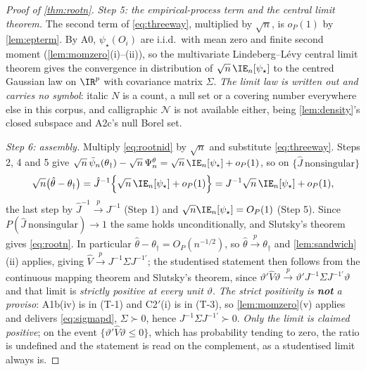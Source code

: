 \begin{proof}[Proof of \cref{thm:rootn}]
\emph{Step 5: the empirical-process term and the central limit theorem.} The second term of
\eqref{eq:threeway}, multiplied by $\sqrt n$, is $o_P(1)$ by \cref{lem:epterm}. By A0, $\psi_\star(O_i)$ are
i.i.d.\ with mean zero and finite second moment (\cref{lem:momzero}(i)--(ii)), so the multivariate
Lindeberg--L\'evy central limit theorem gives the convergence in distribution of
$\sqrt n\,\IE_n[\psi_\star]$ to the centred Gaussian law on $\IR^{p}$ with
covariance matrix $\Sigma$. \emph{The limit law is written out and carries no symbol}: italic
$N$ is a count, a null set or a covering number everywhere else in this corpus, and calligraphic
$\mathcal N$ is not available either, being \cref{lem:density}'s closed subspace and A2c's null Borel set.

\emph{Step 6: assembly.} Multiply \eqref{eq:rootnid} by $\sqrt n$ and substitute
\eqref{eq:threeway}. Steps 2, 4 and 5 give
$\sqrt n\,\bar\psi_n(\theta_\dagger)-\sqrt n\,\Psi^{\theta}_n=\sqrt n\,\IE_n[\psi_\star]+o_P(1)$, so
on $\{\hat J\ \text{nonsingular}\}$
\[
\sqrt n\big(\hat\theta-\theta_\dagger\big)=\hat J^{-1}\Big\{\sqrt n\,\IE_n[\psi_\star]+o_P(1)\Big\}
=J^{-1}\sqrt n\,\IE_n[\psi_\star]+o_P(1),
\]
the last step by $\hat J^{-1}\xrightarrow{p}J^{-1}$ (Step 1) and $\sqrt n\IE_n[\psi_\star]=O_P(1)$
(Step 5). Since $P(\hat J\ \text{nonsingular})\to1$ the same holds unconditionally, and Slutsky's theorem gives
\eqref{eq:rootn}. In particular $\hat\theta-\theta_\dagger=O_P(n^{-1/2})$, so
$\hat\theta\xrightarrow{p}\theta_\dagger$ and \cref{lem:sandwich}(ii) applies, giving
$\hat V\xrightarrow{p}J^{-1}\Sigma J^{-1\prime}$; the studentised statement then follows from the continuous
mapping theorem and Slutsky's theorem, since
$\vartheta'\hat V\vartheta\xrightarrow{p}\vartheta'J^{-1}\Sigma J^{-1\prime}\vartheta$ and that limit is
\emph{strictly positive at every unit $\vartheta$}. \emph{The strict positivity is \textbf{not} a
proviso}: A1b(iv) is in (T-1) and C2$'$(i) is in (T-3), so
\cref{lem:momzero}\textup{(v)} applies and delivers \eqref{eq:sigmapd}, $\Sigma\succ0$, hence
$J^{-1}\Sigma J^{-1\prime}\succ0$. \emph{Only the limit is claimed positive}; on the event
$\{\vartheta'\hat V\vartheta\le0\}$, which has probability tending to zero, the ratio is undefined and the
statement is read on the complement, as a studentised limit always is.
\end{proof}

